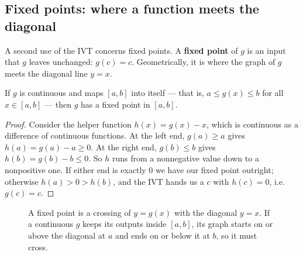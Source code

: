 \subsection{Fixed points: where a function meets the diagonal}

A second use of the IVT concerns fixed points. A \textbf{fixed point} of $g$ is an input that
$g$ leaves unchanged: $g(c)=c$. Geometrically, it is where the graph of $g$ meets the
diagonal line $y=x$.

\begin{corollary}
\label{ch08:cor-fixed}
If $g$ is continuous and maps $[a,b]$ into itself --- that is, $a\le g(x)\le b$ for all
$x\in[a,b]$ --- then $g$ has a fixed point in $[a,b]$.
\end{corollary}

\begin{proof}
Consider the helper function $h(x)=g(x)-x$, which is continuous as a difference of
continuous functions. At the left end, $g(a)\ge a$ gives $h(a)=g(a)-a\ge 0$. At the right
end, $g(b)\le b$ gives $h(b)=g(b)-b\le 0$. So $h$ runs from a nonnegative value down to a
nonpositive one. If either end is exactly $0$ we have our fixed point outright; otherwise
$h(a)>0>h(b)$, and the IVT hands us a $c$ with $h(c)=0$, i.e.\ $g(c)=c$.
\end{proof}

\begin{figure}[htbp]
\centering
{}
\caption{A fixed point is a crossing of $y=g(x)$ with the diagonal $y=x$. If a continuous
$g$ keeps its outputs inside $[a,b]$, its graph starts on or above the diagonal at $a$ and
ends on or below it at $b$, so it must cross.}
\label{ch08:fig-fixed}
\end{figure}

